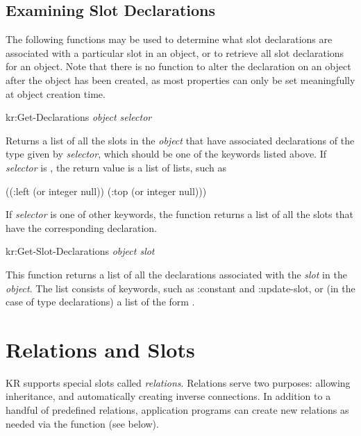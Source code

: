 \subsection{Examining Slot Declarations}

The following functions may be used to determine what slot
declarations are associated with a particular slot in an object, or to
retrieve all slot declarations for an object.  Note that there is no
function to alter the declaration on an object after the object has
been created, as most properties can only be set meaningfully at
object creation time.


\value{f-top}
\begin{example}
kr:Get-Declarations {\it object selector}		\value{function}
\end{example}

Returns a list of all the slots in the {\it object} that have associated
declarations of the type given by {\it selector}, which should be one of
the keywords listed above.  If {\it selector} is , the return value
is a list of lists, such as
\begin{programexample}
((:left (or integer null)) (:top (or integer null)))
\end{programexample}
If {\it selector} is one of other keywords, the function returns a list of all
the slots that have the corresponding declaration.


\value{f-top}
\begin{example}
kr:Get-Slot-Declarations {\it object slot}		\value{function}
\end{example}

This function returns a list of all the declarations associated with
the {\it slot} in the {\it object}.  The list consists of keywords, such
as {\sc :constant} and {\sc :update-slot}, or (in the case of type declarations)
a list of the form .



\section{Relations and Slots}
\value{s-top}

KR supports special slots called {\it relations}.  Relations serve two
purposes: allowing inheritance, and automatically creating inverse
connections.  In addition to a handful of predefined relations,
application programs can create new relations as needed via the
function  (see below).


